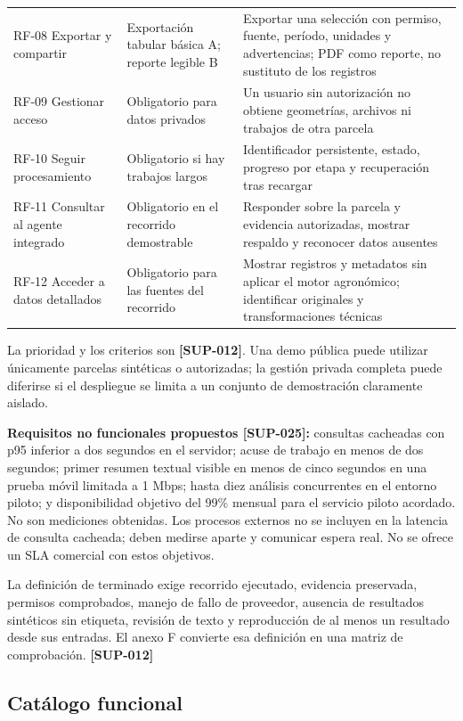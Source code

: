 \documentclass[10pt,a4paper]{article}
\begin{document}
\begin{longtable}{>{\raggedright\arraybackslash}p{3.647cm}>{\raggedright\arraybackslash}p{5.867cm}>{\raggedright\arraybackslash}p{6.343cm}}
RF-08 Exportar y compartir & Exportación tabular básica A; reporte legible B & Exportar una selección con permiso, fuente, período, unidades y advertencias; PDF como reporte, no sustituto de los registros \\[3pt]
RF-09 Gestionar acceso & Obligatorio para datos privados & Un usuario sin autorización no obtiene geometrías, archivos ni trabajos de otra parcela \\[3pt]
RF-10 Seguir procesamiento & Obligatorio si hay trabajos largos & Identificador persistente, estado, progreso por etapa y recuperación tras recargar \\[3pt]
RF-11 Consultar al agente integrado & Obligatorio en el recorrido demostrable & Responder sobre la parcela y evidencia autorizadas, mostrar respaldo y reconocer datos ausentes \\[3pt]
RF-12 Acceder a datos detallados & Obligatorio para las fuentes del recorrido & Mostrar registros y metadatos sin aplicar el motor agronómico; identificar originales y transformaciones técnicas \\[3pt]
\end{longtable}
\endgroup

La prioridad y los criterios son \textbf{[SUP-012]}. Una demo pública puede utilizar únicamente parcelas sintéticas o autorizadas; la gestión privada completa puede diferirse si el despliegue se limita a un conjunto de demostración claramente aislado.


\textbf{Requisitos no funcionales propuestos [SUP-025]:} consultas cacheadas con p95 inferior a dos segundos en el servidor; acuse de trabajo en menos de dos segundos; primer resumen textual visible en menos de cinco segundos en una prueba móvil limitada a 1 Mbps; hasta diez análisis concurrentes en el entorno piloto; y disponibilidad objetivo del 99\% mensual para el servicio piloto acordado. No son mediciones obtenidas. Los procesos externos no se incluyen en la latencia de consulta cacheada; deben medirse aparte y comunicar espera real. No se ofrece un SLA comercial con estos objetivos.


La definición de terminado exige recorrido ejecutado, evidencia preservada, permisos comprobados, manejo de fallo de proveedor, ausencia de resultados sintéticos sin etiqueta, revisión de texto y reproducción de al menos un resultado desde sus entradas. El anexo F convierte esa definición en una matriz de comprobación. \textbf{[SUP-012]}


\subsection{Catálogo funcional}
\end{document}
